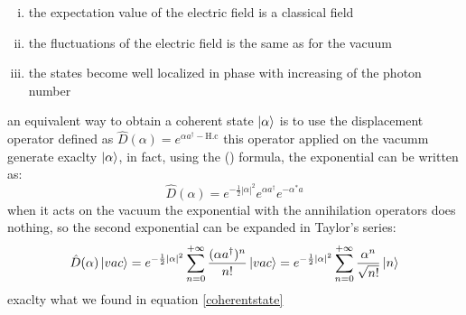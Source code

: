 \documentclass[12pt]{book}
\begin{document}
\begin{enumerate}[(i)]
\item the expectation value of the electric field is a classical field
\item the fluctuations of the electric field is the same as for the vacuum
\item the states become well localized in phase with increasing of the photon number
\end{enumerate}
an equivalent way to obtain a coherent state $\ket{\alpha}$ is to use the displacement operator defined as 
$\hat{D}(\alpha) = e^{\alpha a^\dagger -\text{H.c}}$
this operator applied on the vacumm generate exaclty $\ket{\alpha}$, in fact, using the () formula, the exponential can be written as:
\[\hat{D}(\alpha) = e^{-\frac{1}{2}|\alpha|^2}e^{\alpha a^\dagger} e^{-\alpha^* a}\]
when it acts on the vacuum the exponential with the annihilation operators does nothing, so the second exponential can be expanded in Taylor's series:
\[\hat{D}(\alpha)\ket{vac} = e^{-\frac{1}{2}|\alpha|^2}\sum_{n=0}^{+\infty}\frac{(\alpha a^\dagger)^n}{n!}\ket{vac} = e^{-\frac{1}{2}|\alpha|^2}\sum_{n=0}^{+\infty} \frac{\alpha^n}{\sqrt{n!}}\ket{n}  \]
exaclty what we found in equation \eqref{coherentstate}
\end{document}
